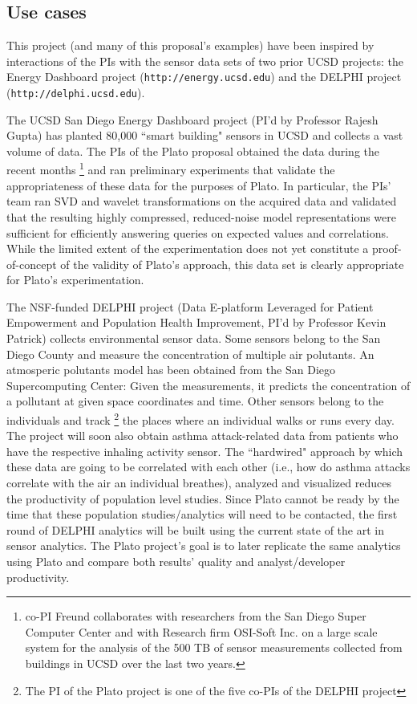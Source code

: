 \subsection{Use cases}
\label{sec:use-cases}
This project (and many of this proposal's examples) have been inspired by interactions of the PIs with the sensor data sets of two prior UCSD projects: the Energy Dashboard project ({\tt http://energy.ucsd.edu}) and the DELPHI project ({\tt http://delphi.ucsd.edu}). 

The UCSD San Diego Energy Dashboard project (PI'd by Professor Rajesh Gupta) has planted 80,000 ``smart building" sensors in UCSD and collects a vast volume of data. The PIs of the Plato proposal obtained the data during the recent months%
\footnote{co-PI Freund collaborates with researchers from the San Diego
Super Computer Center and with Research firm OSI-Soft Inc. on a large
scale system for the analysis of the 500 TB of sensor measurements collected from
buildings in UCSD over the last two years.
} 
and ran preliminary experiments that validate the appropriateness of these data for the purposes of Plato. In particular, the PIs' team ran SVD and wavelet transformations on the acquired data and validated that the resulting highly compressed, reduced-noise model representations were sufficient for efficiently answering queries on expected values and correlations. While the limited extent of the experimentation does not yet constitute a proof-of-concept of the validity of Plato's approach, this data set is clearly appropriate for Plato's experimentation.

The NSF-funded DELPHI project (Data E-platform Leveraged for Patient Empowerment and Population Health Improvement, PI'd by Professor Kevin Patrick) collects environmental sensor data. Some sensors belong to the San Diego County and measure the concentration of multiple air polutants. An atmosperic polutants model has been obtained from the San Diego Supercomputing Center: Given the measurements, it predicts the concentration of a pollutant at given space coordinates and time. Other sensors belong to the individuals and track %
\footnote{The PI of the Plato project is one of the five co-PIs of the DELPHI project} 
the places where an individual walks or runs every day. The project will soon also obtain asthma attack-related data from patients who have the respective inhaling activity sensor. The ``hardwired" approach by which these data are going to be correlated with each other (i.e., how do asthma attacks correlate with the air an individual breathes), analyzed and visualized reduces the productivity of population level studies. Since Plato cannot be ready by the time that these population studies/analytics will need to be contacted, the first round of DELPHI analytics will be built using the current state of the art in sensor analytics. The Plato project's goal is to later replicate the same analytics using Plato and compare both results' quality and analyst/developer productivity.